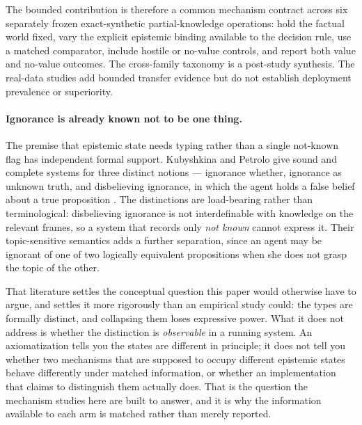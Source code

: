 The bounded contribution is therefore a common mechanism contract across six separately frozen exact-synthetic partial-knowledge operations: hold the factual world fixed, vary the explicit epistemic binding available to the decision rule, use a matched comparator, include hostile or no-value controls, and report both value and no-value outcomes. The cross-family taxonomy is a post-study synthesis. The real-data studies add bounded transfer evidence but do not establish deployment prevalence or superiority.

\paragraph{Ignorance is already known not to be one thing.}
The premise that epistemic state needs typing rather than a single not-known flag has independent formal support. Kubyshkina and Petrolo give sound and complete systems for three distinct notions --- ignorance whether, ignorance as unknown truth, and disbelieving ignorance, in which the agent holds a false belief about a true proposition \cite{kubyshkina2026ignorance}. The distinctions are load-bearing rather than terminological: disbelieving ignorance is not interdefinable with knowledge on the relevant frames, so a system that records only \emph{not known} cannot express it. Their topic-sensitive semantics adds a further separation, since an agent may be ignorant of one of two logically equivalent propositions when she does not grasp the topic of the other.

That literature settles the conceptual question this paper would otherwise have to argue, and settles it more rigorously than an empirical study could: the types are formally distinct, and collapsing them loses expressive power. What it does not address is whether the distinction is \emph{observable} in a running system. An axiomatization tells you the states are different in principle; it does not tell you whether two mechanisms that are supposed to occupy different epistemic states behave differently under matched information, or whether an implementation that claims to distinguish them actually does. That is the question the mechanism studies here are built to answer, and it is why the information available to each arm is matched rather than merely reported.
